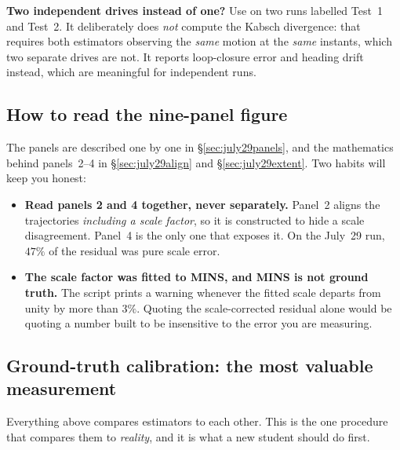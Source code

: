 \noindent \textbf{Two independent drives instead of one?} Use
 on two runs labelled Test~1 and Test~2. It
deliberately does \emph{not} compute the Kabsch divergence: that requires
both estimators observing the \emph{same} motion at the \emph{same} instants,
which two separate drives are not. It reports loop-closure error and heading
drift instead, which are meaningful for independent runs.

\subsection{How to read the nine-panel figure}
The panels are described one by one in \S\ref{sec:july29panels}, and the
mathematics behind panels~2--4 in \S\ref{sec:july29align} and
\S\ref{sec:july29extent}. Two habits will keep you honest:

\begin{itemize}[leftmargin=1.4em]
\item \textbf{Read panels 2 and 4 together, never separately.} Panel~2 aligns
  the trajectories \emph{including a scale factor}, so it is constructed to
  hide a scale disagreement. Panel~4 is the only one that exposes it. On the
  July~29 run, $47\%$ of the residual was pure scale error.
\item \textbf{The scale factor was fitted to MINS, and MINS is not ground
  truth.} The script prints a warning whenever the fitted scale departs from
  unity by more than $3\%$. Quoting the scale-corrected residual alone would be
  quoting a number built to be insensitive to the error you are measuring.
\end{itemize}

\subsection{Ground-truth calibration: the most valuable measurement}
\label{ap:repro-calibrun}
Everything above compares estimators to each other. This is the one procedure
that compares them to \emph{reality}, and it is what a new student should do
first.

